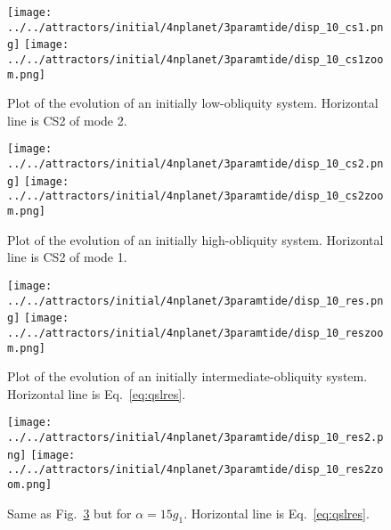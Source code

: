 \documentclass[11pt,
        usenames, %
        dvipsnames %
    ]{article}
\begin{document}
\begin{figure}
    \centering
    \texttt{[image: ../../attractors/initial/4nplanet/3paramtide/disp\_10\_cs1.png]}
    \texttt{[image: ../../attractors/initial/4nplanet/3paramtide/disp\_10\_cs1zoom.png]}
    \caption{Plot of the evolution of an initially low-obliquity
    system. Horizontal line is CS2 of mode 2.}\label{fig:cs1}
\end{figure}
\begin{figure}
    \centering
    \texttt{[image: ../../attractors/initial/4nplanet/3paramtide/disp\_10\_cs2.png]}
    \texttt{[image: ../../attractors/initial/4nplanet/3paramtide/disp\_10\_cs2zoom.png]}
    \caption{Plot of the evolution of an initially high-obliquity
    system. Horizontal line is CS2 of mode 1.}\label{fig:cs2}
\end{figure}
\begin{figure}
    \centering
    \texttt{[image: ../../attractors/initial/4nplanet/3paramtide/disp\_10\_res.png]}
    \texttt{[image: ../../attractors/initial/4nplanet/3paramtide/disp\_10\_reszoom.png]}
    \caption{Plot of the evolution of an initially intermediate-obliquity
    system. Horizontal line is Eq.~\eqref{eq:qslres}.}\label{fig:res}
\end{figure}
\begin{figure}
    \centering
    \texttt{[image: ../../attractors/initial/4nplanet/3paramtide/disp\_10\_res2.png]}
    \texttt{[image: ../../attractors/initial/4nplanet/3paramtide/disp\_10\_res2zoom.png]}
    \caption{Same as Fig.~\ref{fig:res} but for $\alpha =
    15g_1$. Horizontal line is Eq.~\eqref{eq:qslres}.}\label{fig:res2}
\end{figure}
\end{document}
